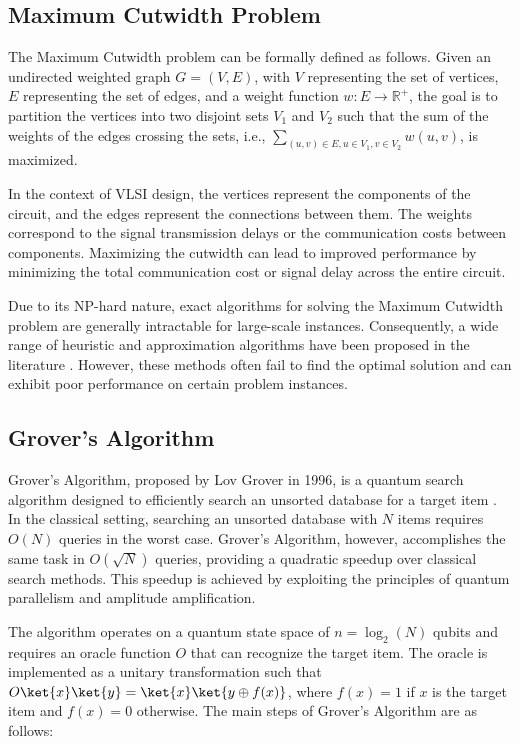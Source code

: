 \subsection{Maximum Cutwidth Problem}

The Maximum Cutwidth problem can be formally defined as follows. Given an undirected weighted graph $G = (V, E)$, with $V$ representing the set of vertices, $E$ representing the set of edges, and a weight function $w : E \rightarrow \mathbb{R}^+$, the goal is to partition the vertices into two disjoint sets $V_1$ and $V_2$ such that the sum of the weights of the edges crossing the sets, i.e., $\sum_{(u, v) \in E, u \in V_1, v \in V_2} w(u, v)$, is maximized.

In the context of VLSI design, the vertices represent the components of the circuit, and the edges represent the connections between them. The weights correspond to the signal transmission delays or the communication costs between components. Maximizing the cutwidth can lead to improved performance by minimizing the total communication cost or signal delay across the entire circuit.

Due to its NP-hard nature, exact algorithms for solving the Maximum Cutwidth problem are generally intractable for large-scale instances. Consequently, a wide range of heuristic and approximation algorithms have been proposed in the literature \cite{heuristic_algorithm1, heuristic_algorithm2}. However, these methods often fail to find the optimal solution and can exhibit poor performance on certain problem instances.

\subsection{Grover's Algorithm}

Grover's Algorithm, proposed by Lov Grover in 1996, is a quantum search algorithm designed to efficiently search an unsorted database for a target item \cite{grover}. In the classical setting, searching an unsorted database with $N$ items requires $O(N)$ queries in the worst case. Grover's Algorithm, however, accomplishes the same task in $O(\sqrt{N})$ queries, providing a quadratic speedup over classical search methods. This speedup is achieved by exploiting the principles of quantum parallelism and amplitude amplification.

The algorithm operates on a quantum state space of $n = \log_2(N)$ qubits and requires an oracle function $O$ that can recognize the target item. The oracle is implemented as a unitary transformation such that $O\ket{x}\ket{y} = \ket{x}\ket{y \oplus f(x)}$, where $f(x) = 1$ if $x$ is the target item and $f(x) = 0$ otherwise. The main steps of Grover's Algorithm are as follows:

